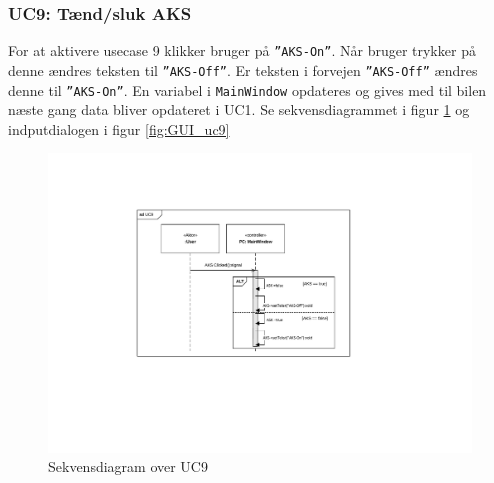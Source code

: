 \clearpage

\subsubsection{UC9: Tænd/sluk AKS}
For at aktivere usecase 9 klikker bruger på \texttt{''AKS-On''}.
Når bruger trykker på denne ændres teksten til \texttt{''AKS-Off''}. Er teksten i forvejen \texttt{''AKS-Off''} ændres denne til \texttt{''AKS-On''}. En variabel i \texttt{MainWindow} opdateres og gives med til bilen næste gang data bliver opdateret i UC1. Se sekvensdiagrammet i figur \ref{fig:cd_uc9} og indputdialogen i figur \ref{fig:GUI_uc9}

\begin{figure}[H]
\centering
\includegraphics[width=\textwidth* 2/3,height=\textwidth* 4/10 ]{../fig/diagrammer/pc/sd_uc9.pdf}
\caption{Sekvensdiagram over UC9}
\label{fig:cd_uc9}
\end{figure}

